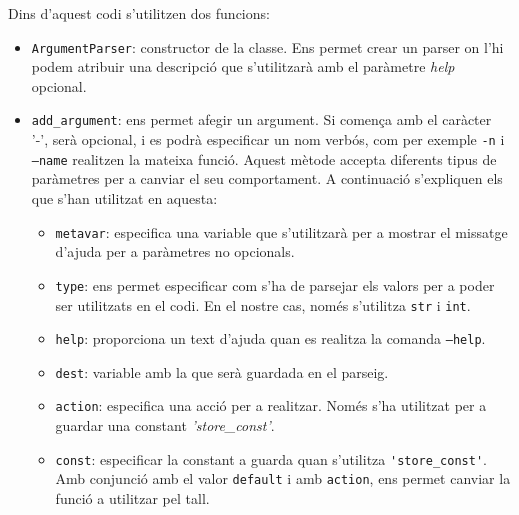  Dins d'aquest codi s'utilitzen dos funcions:
 \begin{itemize}
 	\item \texttt{ArgumentParser}: constructor de la classe. Ens permet crear un parser on l'hi
 	podem atribuir una descripció que s'utilitzarà amb el paràmetre \textit{help} opcional.
 	
 	\item \verb|add_argument|: ens permet afegir un argument. Si comença amb el caràcter
 	'-', serà opcional, i es podrà especificar un nom verbós, com per exemple \texttt{-n} i
 	\texttt{--name} realitzen la mateixa funció. Aquest mètode accepta diferents tipus de 
 	paràmetres per a canviar el seu comportament. A continuació s'expliquen els que s'han utilitzat
 	en aquesta:
 		\begin{itemize}
 			\item \texttt{metavar}: especifica una variable que s'utilitzarà per a mostrar el missatge
 			d'ajuda per a paràmetres no opcionals.
 			
 			\item \texttt{type}: ens permet especificar com s'ha de parsejar els valors per a poder
 			ser utilitzats en el codi. En el nostre cas, només s'utilitza \texttt{str} i \texttt{int}.
 			
 			\item \texttt{help}: proporciona un text d'ajuda quan es realitza la comanda \texttt{--help}.
 			
 			\item \texttt{dest}: variable amb la que serà guardada en el parseig.
 			
 			\item \texttt{action}: especifica una acció per a realitzar. Només s'ha utilitzat per a 
 			guardar una constant \textit{'store\_const'}.
 		
 			\item \texttt{const}: especificar la constant a guarda quan s'utilitza \verb|'store_const'|.
 			Amb conjunció amb el valor \texttt{default} i amb \texttt{action}, ens permet canviar 
 			la funció a utilitzar pel tall.
 		\end{itemize}
 \end{itemize}
